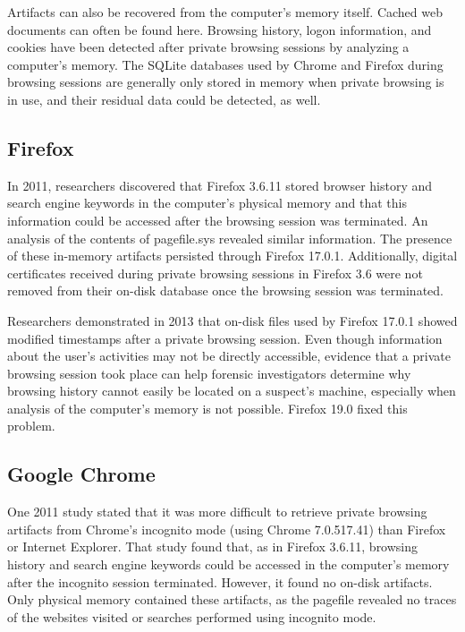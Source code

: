 \documentclass[pdftex,letterpaper,titlepage,12pt]{article}
\begin{document}
    Artifacts can also be recovered from the computer's memory itself. Cached
    web documents can often be found here.\cite{ohana13} Browsing history,
    logon information, and cookies have been detected after private browsing
    sessions by analyzing a computer's memory. The SQLite databases used by 
    Chrome and Firefox during browsing sessions are generally only stored in 
    memory when private browsing is in use, and their residual data could be 
    detected, as well.\cite{satvat13}

    \subsection{Firefox}
    In 2011, researchers discovered that Firefox 3.6.11 stored browser history
    and search engine keywords in the computer's physical memory and that this
    information could be accessed after the browsing session was terminated.
    An analysis of the contents of pagefile.sys revealed similar information.
    \cite{said11} The presence of these in-memory artifacts persisted through 
    Firefox 17.0.1.\cite{ohana13} Additionally, digital certificates received 
    during private browsing sessions in Firefox 3.6 were not removed from their 
    on-disk database once the browsing session was terminated.\cite{aggarwal10}
    
    Researchers demonstrated in 2013 that on-disk files used by Firefox 17.0.1 
    showed modified timestamps after a private browsing session. Even though
    information about the user's activities may not be directly accessible,
    evidence that a private browsing session took place can help forensic
    investigators determine why browsing history cannot easily be located on a
    suspect's machine, especially when analysis of the computer's memory is not
    possible.\cite{ohana13} Firefox 19.0 fixed this problem.\cite{satvat13}

    \subsection{Google Chrome}
    One 2011 study stated that it was more difficult to retrieve private
    browsing artifacts from Chrome's incognito mode (using Chrome 7.0.517.41) 
    than Firefox or Internet Explorer. That study found that, as in Firefox 
    3.6.11, browsing history and search engine keywords could be accessed in 
    the computer's memory after the incognito session terminated. However, it 
    found no on-disk artifacts. Only physical memory contained these artifacts, 
    as the pagefile revealed no traces of the websites visited or searches 
    performed using incognito mode.\cite{said11}
    
\end{document}
